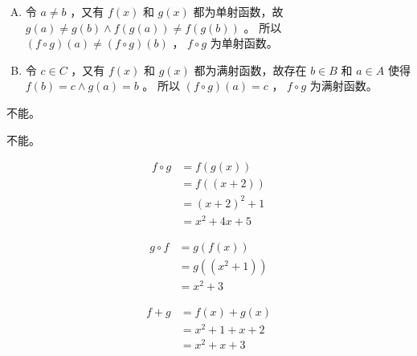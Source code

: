 {{        %
        \begin{practices}
            \begin{enumerate}[A.]
                \item
                {
                    令 $a \neq b$ ，又有 $f(x)$ 和 $g(x)$ 都为单射函数，故 $g(a) \neq g(b) \wedge f(g(a)) \neq f(g(b))$ 。
                    所以 $(f \circ g)(a) \neq (f \circ g)(b)$ ， $f \circ g$ 为单射函数。
                }
                \item
                {
                    令 $c \in C$ ，又有 $f(x)$ 和 $g(x)$ 都为满射函数，故存在 $b \in B$ 和 $a \in A$ 使得  $f(b) = c \wedge g(a) = b$ 。
                    所以 $(f \circ g)(a) = c$ ， $f \circ g$ 为满射函数。
                }
            \end{enumerate}
        \end{practices}

        \begin{practices}
            不能。
        \end{practices}

        \begin{practices}
            不能。
        \end{practices}

        \begin{practices}
            \begin{align*}
                f \circ g
                &= f(g(x)) \\
                &= f((x + 2)) \\
                &= (x + 2)^2 + 1 \\
                &= x^2 + 4x + 5
            \end{align*}

            \begin{align*}
                g \circ f
                &= g(f(x)) \\
                &= g((x^2 + 1)) \\
                &= x^2 + 3
            \end{align*}
        \end{practices}

        \begin{practices}
            \begin{align*}
                f + g
                &= f(x) + g(x) \\
                &= x^2 + 1 + x + 2 \\
                &= x^2 + x + 3
            \end{align*}


\end{practices}}}
